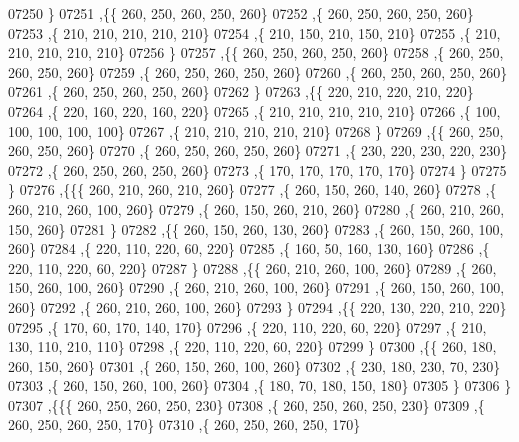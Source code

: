 \begin{DoxyCode}
07250     \}
07251    ,\{\{   260,   250,   260,   250,   260\}
07252     ,\{   260,   250,   260,   250,   260\}
07253     ,\{   210,   210,   210,   210,   210\}
07254     ,\{   210,   150,   210,   150,   210\}
07255     ,\{   210,   210,   210,   210,   210\}
07256     \}
07257    ,\{\{   260,   250,   260,   250,   260\}
07258     ,\{   260,   250,   260,   250,   260\}
07259     ,\{   260,   250,   260,   250,   260\}
07260     ,\{   260,   250,   260,   250,   260\}
07261     ,\{   260,   250,   260,   250,   260\}
07262     \}
07263    ,\{\{   220,   210,   220,   210,   220\}
07264     ,\{   220,   160,   220,   160,   220\}
07265     ,\{   210,   210,   210,   210,   210\}
07266     ,\{   100,   100,   100,   100,   100\}
07267     ,\{   210,   210,   210,   210,   210\}
07268     \}
07269    ,\{\{   260,   250,   260,   250,   260\}
07270     ,\{   260,   250,   260,   250,   260\}
07271     ,\{   230,   220,   230,   220,   230\}
07272     ,\{   260,   250,   260,   250,   260\}
07273     ,\{   170,   170,   170,   170,   170\}
07274     \}
07275    \}
07276   ,\{\{\{   260,   210,   260,   210,   260\}
07277     ,\{   260,   150,   260,   140,   260\}
07278     ,\{   260,   210,   260,   100,   260\}
07279     ,\{   260,   150,   260,   210,   260\}
07280     ,\{   260,   210,   260,   150,   260\}
07281     \}
07282    ,\{\{   260,   150,   260,   130,   260\}
07283     ,\{   260,   150,   260,   100,   260\}
07284     ,\{   220,   110,   220,    60,   220\}
07285     ,\{   160,    50,   160,   130,   160\}
07286     ,\{   220,   110,   220,    60,   220\}
07287     \}
07288    ,\{\{   260,   210,   260,   100,   260\}
07289     ,\{   260,   150,   260,   100,   260\}
07290     ,\{   260,   210,   260,   100,   260\}
07291     ,\{   260,   150,   260,   100,   260\}
07292     ,\{   260,   210,   260,   100,   260\}
07293     \}
07294    ,\{\{   220,   130,   220,   210,   220\}
07295     ,\{   170,    60,   170,   140,   170\}
07296     ,\{   220,   110,   220,    60,   220\}
07297     ,\{   210,   130,   110,   210,   110\}
07298     ,\{   220,   110,   220,    60,   220\}
07299     \}
07300    ,\{\{   260,   180,   260,   150,   260\}
07301     ,\{   260,   150,   260,   100,   260\}
07302     ,\{   230,   180,   230,    70,   230\}
07303     ,\{   260,   150,   260,   100,   260\}
07304     ,\{   180,    70,   180,   150,   180\}
07305     \}
07306    \}
07307   ,\{\{\{   260,   250,   260,   250,   230\}
07308     ,\{   260,   250,   260,   250,   230\}
07309     ,\{   260,   250,   260,   250,   170\}
07310     ,\{   260,   250,   260,   250,   170\}

\end{DoxyCode}
